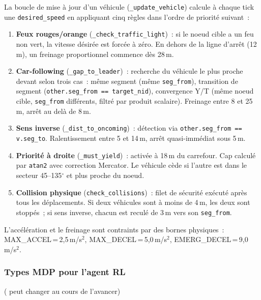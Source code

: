 \documentclass[a4paper,10pt]{article}
\begin{document}
La boucle de mise \`{a} jour d'un v\'{e}hicule (\texttt{\_update\_vehicle})
calcule \`{a} chaque tick une \texttt{desired\_speed} en appliquant cinq
r\`{e}gles dans l'ordre de priorit\'{e} suivant~:

\begin{enumerate}[leftmargin=1.8em,itemsep=1pt]
  \item \textbf{Feux rouges/orange} (\texttt{\_check\_traffic\_light})~:
  si le noeud cible a un feu non vert, la vitesse d\'{e}sir\'{e}e est forc\'{e}e
  \`{a} z\'{e}ro. En dehors de la ligne d'arr\^{e}t (12\,m), un freinage
  proportionnel commence d\`{e}s 28\,m.

  \item \textbf{Car-following} (\texttt{\_gap\_to\_leader})~: recherche
  du v\'{e}hicule le plus proche devant selon trois cas~:
  m\^{e}me segment (m\^{e}me \texttt{seg\_from}),
  transition de segment (\texttt{other.seg\_from == target\_nid}),
  convergence Y/T (m\^{e}me noeud cible, \texttt{seg\_from} diff\'{e}rents,
  filtr\'{e} par produit scalaire). Freinage entre 8 et 25\,m,
  arr\^{e}t au del\`{a} de 8\,m.

  \item \textbf{Sens inverse} (\texttt{\_dist\_to\_oncoming})~:
  d\'{e}tection via \texttt{other.seg\_from == v.seg\_to}.
  Ralentissement entre 5 et 14\,m, arr\^{e}t quasi-imm\'{e}diat sous 5\,m.

  \item \textbf{Priorit\'{e} \`{a} droite} (\texttt{\_must\_yield})~:
  activ\'{e}e \`{a} 18\,m du carrefour. Cap calcul\'{e} par \texttt{atan2} avec
  correction Mercator. Le v\'{e}hicule c\`{e}de si l'autre est dans le secteur
  45--135$^{\circ}$ et plus proche du noeud.

  \item \textbf{Collision physique} (\texttt{check\_collisions})~:
  filet de s\'{e}curit\'{e} ex\'{e}cut\'{e} apr\`{e}s tous les d\'{e}placements.
  Si deux v\'{e}hicules sont \`{a} moins de 4\,m, les deux sont stopp\'{e}s~;
  si sens inverse, chacun est recul\'{e} de 3\,m vers son \texttt{seg\_from}.
\end{enumerate}

L'acc\'{e}l\'{e}ration et le freinage sont contraints par des bornes physiques~:
MAX\_ACCEL\,=\,2,5\,m/s$^2$, MAX\_DECEL\,=\,5,0\,m/s$^2$,
EMERG\_DECEL\,=\,9,0\,m/s$^2$.

\subsubsection*{Types MDP pour l'agent RL} ( peut changer au cours de l'avancer)
\end{document}
